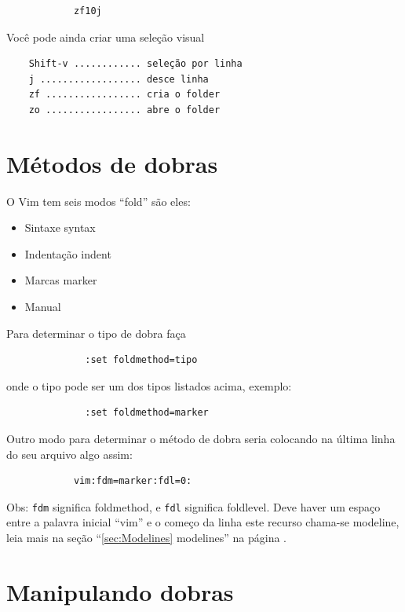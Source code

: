 \documentclass[10pt,a4paper,openany]{book}
\begin{document}
\begin{verbatim}
			zf10j
\end{verbatim}

Você pode ainda criar uma seleção visual

\begin{verbatim}
	Shift-v ............ seleção por linha
	j .................. desce linha
	zf ................. cria o folder
	zo ................. abre o folder
\end{verbatim}

\section{Métodos de dobras }
\label{Métodos de dobras }
O Vim tem seis modos ``fold'' são eles:

\begin{itemize}
\item Sintaxe syntax
\item Indentação indent
\item Marcas marker
\item Manual
\end{itemize}

Para determinar o tipo de dobra faça

\begin{verbatim}
			  :set foldmethod=tipo
\end{verbatim}

onde o tipo pode ser um dos tipos listados acima, exemplo:

\begin{verbatim}
			  :set foldmethod=marker
\end{verbatim}

Outro modo para determinar o método de dobra seria colocando na última
linha do seu arquivo algo assim:

\begin{verbatim}
			vim:fdm=marker:fdl=0:
\end{verbatim}

Obs: \verb|fdm| significa foldmethod, e \verb|fdl| significa
foldlevel. Deve haver um espaço entre a palavra inicial ``vim'' e o
começo da linha este recurso chama-se modeline, leia mais na seção
``\ref{sec:Modelines} modelines'' na página \pageref{sec:Modelines}.

\section{Manipulando dobras }\label{Manipulando dobras }
\end{document}
